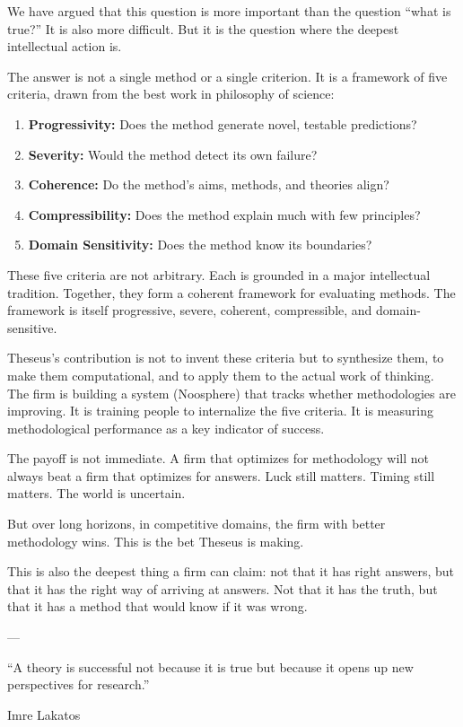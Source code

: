 \documentclass[11pt,letterpaper]{article}
\begin{document}
We have argued that this question is more important than the question ``what is true?'' It is also more difficult. But it is the question where the deepest intellectual action is.

The answer is not a single method or a single criterion. It is a framework of five criteria, drawn from the best work in philosophy of science:

\begin{enumerate}
  \item \textbf{Progressivity:} Does the method generate novel, testable predictions?
  \item \textbf{Severity:} Would the method detect its own failure?
  \item \textbf{Coherence:} Do the method's aims, methods, and theories align?
  \item \textbf{Compressibility:} Does the method explain much with few principles?
  \item \textbf{Domain Sensitivity:} Does the method know its boundaries?
\end{enumerate}

These five criteria are not arbitrary. Each is grounded in a major intellectual tradition. Together, they form a coherent framework for evaluating methods. The framework is itself progressive, severe, coherent, compressible, and domain-sensitive.

Theseus's contribution is not to invent these criteria but to synthesize them, to make them computational, and to apply them to the actual work of thinking. The firm is building a system (Noosphere) that tracks whether methodologies are improving. It is training people to internalize the five criteria. It is measuring methodological performance as a key indicator of success.

The payoff is not immediate. A firm that optimizes for methodology will not always beat a firm that optimizes for answers. Luck still matters. Timing still matters. The world is uncertain.

But over long horizons, in competitive domains, the firm with better methodology wins. This is the bet Theseus is making.

This is also the deepest thing a firm can claim: not that it has right answers, but that it has the right way of arriving at answers. Not that it has the truth, but that it has a method that would know if it was wrong.

---

\epigraph{
  ``A theory is successful not because it is true but because it opens up new perspectives for research.''
}{Imre Lakatos}
\end{document}
